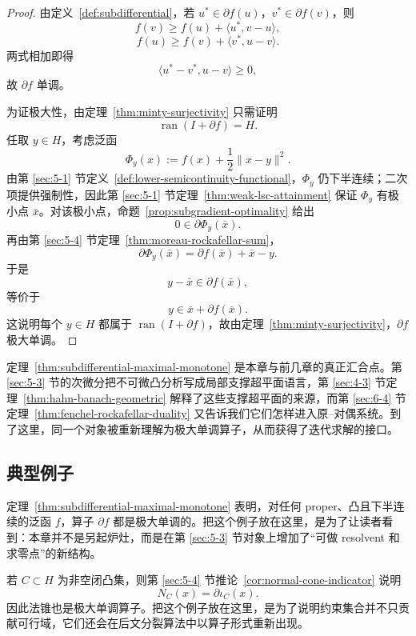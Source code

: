 \begin{proof}
由定义~\ref{def:subdifferential}，若 $u^\ast\in \partial f(u)$，$v^\ast\in \partial f(v)$，则
\[
f(v)\ge f(u)+\langle u^\ast,v-u\rangle,
\]
\[
f(u)\ge f(v)+\langle v^\ast,u-v\rangle.
\]
两式相加即得
\[
\langle u^\ast-v^\ast,u-v\rangle\ge 0,
\]
故 $\partial f$ 单调。

为证极大性，由定理~\ref{thm:minty-surjectivity} 只需证明
\[
\operatorname{ran}(I+\partial f)=H.
\]
任取 $y\in H$，考虑泛函
\[
\Phi_y(x):=f(x)+\frac12\|x-y\|^2.
\]
由第 \ref{sec:5-1} 节定义~\ref{def:lower-semicontinuity-functional}，$\Phi_y$ 仍下半连续；二次项提供强制性，因此第 \ref{sec:5-1} 节定理~\ref{thm:weak-lsc-attainment} 保证 $\Phi_y$ 有极小点 $\bar x$。对该极小点，命题~\ref{prop:subgradient-optimality} 给出
\[
0\in \partial \Phi_y(\bar x).
\]
再由第 \ref{sec:5-4} 节定理~\ref{thm:moreau-rockafellar-sum}，
\[
\partial \Phi_y(\bar x)=\partial f(\bar x)+\bar x-y.
\]
于是
\[
y-\bar x\in \partial f(\bar x),
\]
等价于
\[
y\in \bar x+\partial f(\bar x).
\]
这说明每个 $y\in H$ 都属于 $\operatorname{ran}(I+\partial f)$，故由定理~\ref{thm:minty-surjectivity}，$\partial f$ 极大单调。
\end{proof}

\begin{remark}
定理~\ref{thm:subdifferential-maximal-monotone} 是本章与前几章的真正汇合点。第 \ref{sec:5-3} 节的次微分把不可微凸分析写成局部支撑超平面语言，第 \ref{sec:4-3} 节定理~\ref{thm:hahn-banach-geometric} 解释了这些支撑超平面的来源，而第 \ref{sec:6-4} 节定理~\ref{thm:fenchel-rockafellar-duality} 又告诉我们它们怎样进入原--对偶系统。到了这里，同一个对象被重新理解为极大单调算子，从而获得了迭代求解的接口。
\end{remark}

\subsection{典型例子}

\begin{example}[闭真凸下半连续泛函的次微分]
定理~\ref{thm:subdifferential-maximal-monotone} 表明，对任何 proper、凸且下半连续的泛函 $f$，算子 $\partial f$ 都是极大单调的。把这个例子放在这里，是为了让读者看到：本章并不是另起炉灶，而是在第 \ref{sec:5-3} 节对象上增加了“可做 resolvent 和求零点”的新结构。
\end{example}

\begin{example}[闭凸集的法锥]
若 $C\subset H$ 为非空闭凸集，则第 \ref{sec:5-4} 节推论~\ref{cor:normal-cone-indicator} 说明
\[
N_C(x)=\partial \iota_C(x).
\]
因此法锥也是极大单调算子。把这个例子放在这里，是为了说明约束集合并不只贡献可行域，它们还会在后文分裂算法中以算子形式重新出现。
\end{example}

